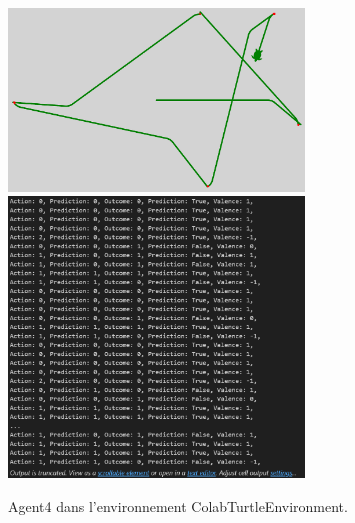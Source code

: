 \documentclass[a4paper, 12pt]{article}
\begin{document}
\begin{figure}[h]
    \centering
    \includegraphics[width=0.7\textwidth]{ReportImages/Agent4/Agent4_tortue.png}
    \includegraphics[width=0.7\textwidth]{ReportImages/Agent4/Agent4_50_actions.png}
    \caption{Agent4 dans l'environnement ColabTurtleEnvironment.}
\end{figure}
\end{document}
